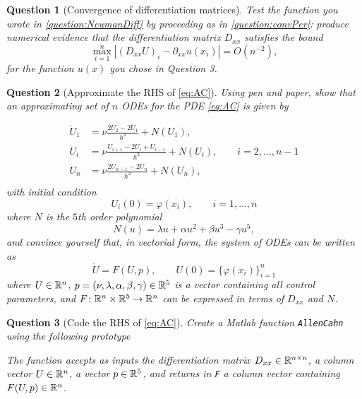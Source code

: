 \documentclass[a4paper]{siamart220329}
\theoremstyle{plain}
\newtheorem{question}{Question}
\begin{document}
\begin{question}[Convergence of differentiation matrices] Test the function you wrote
  in \cref{question:NeumanDiff} by proceeding as in \cref{question:convPer}: produce
  numerical evidence that the differentiation matrix $D_{x x}$
satisfies the bound
\[
   \max_{i=1}^n | (D_{x x} U)_i - \partial_{x x} u(x_i) | = O(n^{-2}),
\]
for the function $u(x)$ you chose in Question 3.
\end{question}

\begin{question}[Approximate the RHS of \cref{eq:AC}] Using pen and paper, show that an approximating set of $n$
ODEs for the PDE \cref{eq:AC} is given by

\[
  \begin{aligned}
    \dot U_1 & = \nu \frac{2 U_2 - 2 U_1}{h^2} + N(U_1), \\
    \dot U_{i} & = \nu \frac{U_{i+1} - 2 U_{i}+U_{i-1}}{h^2} + N(U_{i}), \qquad i = 2,\ldots,n-1 \\
    \dot U_{n} & = \nu \frac{2 U_{n-1}-2U_n}{h^2} + N(U_{n}), \\
  \end{aligned}
\]
with initial condition
\[
  U_i(0) = \varphi(x_i), \qquad i = 1,\ldots,n
\]
where $N$ is the $5$th order polynomial
\[
  N(u) = \lambda u + \alpha u^2 + \beta u^3 - \gamma u^5,
\]
and convince yourself that, in vectorial form, the system of ODEs can be written as
\begin{equation}\label{eq:ODE}
  \dot U = F(U,p), \qquad U(0) = \{ \varphi(x_i) \}_{i=1}^n
\end{equation}
where $U \in \mathbb{R}^n$, $p = (\nu,\lambda,\alpha,\beta,\gamma) \in \mathbb{R}^5$ is a
vector containing all control parameters, and $F \colon \mathbb{R}^n \times \mathbb{R}^5 \to
\mathbb{R}^n$ can be expressed in terms of $D_{xx}$ and $N$.
\end{question}

\begin{question}[Code the RHS of \cref{eq:AC}] Create a Matlab function \lstinline|AllenCahn| using the
following prototype

The function accepts as inputs the differentiation matrix $D_{x x} \in \mathbb{R}^{n
\times n}$, a column vector $U \in \mathbb{R}^{n}$, a vector $p \in \mathbb{R}^5$, and returns
in \lstinline|F| a column vector containing $F(U,p) \in \mathbb{R}^n$.
\end{question}
\end{document}

